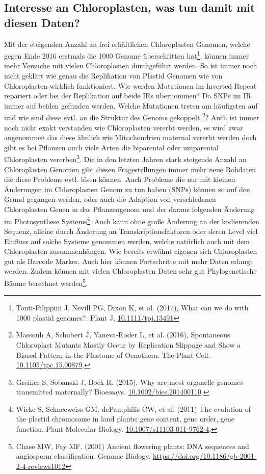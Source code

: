 \documentclass{scrartcl}
\begin{document}
\subsection{Interesse an Chloroplasten, was tun damit mit diesen Daten?}
\label{sec-2-6}
Mit der steigenden Anzahl an frei erhältlichen Chloroplasten Genomen, welche gegen Ende 2016 erstmals die 1000 Genome überschritten hat\footnote{Tonti-Filippini J, Nevill PG, Dixon K, et al. (2017), What can we do with 1000 plastid genomes?. Plant J, \url{10.1111/tpj.13491}}, können immer mehr Versuche mit vielen Chloroplasten durchgeführt werden.
So ist immer noch nicht geklärt wie genau die Replikation von Plastid Genomen wie von Chloroplasten wirklich funktioniert. Wie werden Mutationen im Inverted Repeat repariert oder bei der Replikation auf beide IRs übernommen?
Da SNPs im IR immer auf beiden gefunden werden. Welche Mutationen treten am häufigsten auf und wie sind diese evtl. an die Struktur des Genoms gekoppelt \footnote{Massouh A, Schubert J, Yaneva-Roder L, et al. (2016), Spontaneous Chloroplast Mutants Mostly Occur by Replication Slippage and Show a Biased Pattern in the Plastome of Oenothera. The Plant Cell. \url{10.1105/tpc.15.00879}.}? Auch ist immer noch nicht exakt verstanden wie Chloroplasten
vererbt werden, es wird zwar angenommen das diese ähnlich wie Mitochondrien maternal vererbt werden doch gibt es bei Pflanzen auch viele Arten die biparental oder uniparental Chloroplasten vererben\footnote{Greiner S, Sobanski J, Bock R. (2015), Why are most organelle genomes transmitted maternally? Bioessays. \url{10.1002/bies.201400110}.}. Die in den letzten 
Jahren stark steigende Anzahl an Chloroplasten Genomen gibt diesen Fragestellungen immer mehr neue Rohdaten die diese Probleme evtl. lösen können. Auch Probleme die nur mit kleinen Änderungen im Chloroplasten Genom zu tun 
haben (SNPs)
können so auf den Grund gegangen werden, oder auch die Adaption von verschiedenen Chloroplasten Genen in das Pflanzengenom und der daraus folgenden Änderung im Photosynthese Systems\footnote{Wicke S, Schneeweiss GM, dePamphilis CW, et al. (2011) The evolution of the plastid chromosome in land plants: gene content, gene order, gene function. Plant Molecular Biology.  \url{10.1007/s11103-011-9762-4}.}. Auch kann ohne große Änderung an der
kodierenden Sequenz, alleine durch Änderung an Transkriptionsfaktoren oder deren Level viel Einfluss auf solche Systeme genommen werden, welche natürlich auch mit dem Chloroplasten zusammenhängen\footnotemark[33]{}. Wie bereits erwähnt 
eigenen sich Chloroplasten gut als Barcode Marker. Auch hier können Fortschritte mit mehr Daten erlangt werden. Zudem können mit vielen Chloroplasten Daten sehr gut Phylogenetische Bäume berechnet werden\footnote{Chase MW, Fay MF. (2001) Ancient flowering plants: DNA sequences and angiosperm classification. Genome Biology. \url{https://doi.org/10.1186/gb-2001-2-4-reviews1012}}.
\end{document}
